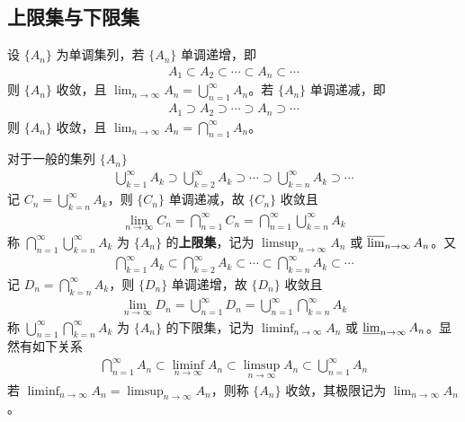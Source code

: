 \documentclass[../../main.tex]{subfiles}
\begin{document}
\subsection{上限集与下限集}

设 $\{A_n\}$ 为单调集列，若 $\{A_n\}$ 单调递增，即
\begin{align*}
A_1 \subset A_2 \subset \cdots \subset A_n \subset \cdots
\end{align*}
则 $\{A_n\}$ 收敛，且 $\lim_{n \to \infty} A_n = \bigcup_{n = 1}^{\infty} A_n$。若 $\{A_n\}$ 单调递减，即
\begin{align*}
A_1 \supset A_2 \supset \cdots \supset A_n \supset \cdots
\end{align*}
则 $\{A_n\}$ 收敛，且 $\lim_{n \to \infty} A_n = \bigcap_{n = 1}^{\infty} A_n$。

\begin{definition}[上限集和下限集]
对于一般的集列 $\{A_n\}$
\begin{align*}
\bigcup_{k = 1}^{\infty} A_k \supset \bigcup_{k = 2}^{\infty} A_k \supset \cdots \supset \bigcup_{k = n}^{\infty} A_k \supset \cdots
\end{align*}
记 $C_n = \bigcup_{k = n}^{\infty} A_k$，则 $\{C_n\}$ 单调递减，故 $\{C_n\}$ 收敛且
\begin{align*}
\lim_{n \to \infty} C_n = \bigcap_{n = 1}^{\infty} C_n = \bigcap_{n = 1}^{\infty} \bigcup_{k = n}^{\infty} A_k
\end{align*}
称 $\bigcap_{n = 1}^{\infty} \bigcup_{k = n}^{\infty} A_k$ 为 $\{A_n\}$ 的\textbf{上限集}，记为 $\limsup_{n \to \infty} A_n$ 或 $\varlimsup_{n \to \infty} A_n$。又
\begin{align*}
\bigcap_{k = 1}^{\infty} A_k \subset \bigcap_{k = 2}^{\infty} A_k \subset \cdots \subset \bigcap_{k = n}^{\infty} A_k \subset \cdots
\end{align*}
记 $D_n = \bigcap_{k = n}^{\infty} A_k$，则 $\{D_n\}$ 单调递增，故 $\{D_n\}$ 收敛且
\begin{align*}
\lim_{n \to \infty} D_n = \bigcup_{n = 1}^{\infty} D_n = \bigcup_{n = 1}^{\infty} \bigcap_{k = n}^{\infty} A_k
\end{align*}
称 $\bigcup_{n = 1}^{\infty} \bigcap_{k = n}^{\infty} A_k$ 为 $\{A_n\}$ 的下限集，记为 $\liminf_{n \to \infty} A_n$ 或 $\varliminf_{n \to \infty} A_n$。显然有如下关系
\begin{align*}
\bigcap_{n = 1}^{\infty} A_n \subset \liminf_{n \to \infty} A_n \subset \limsup_{n \to \infty} A_n \subset \bigcup_{n = 1}^{\infty} A_n
\end{align*}
若 $\liminf_{n \to \infty} A_n = \limsup_{n \to \infty} A_n$，则称 $\{A_n\}$ 收敛，其极限记为 $\lim_{n \to \infty} A_n$。 
\end{definition}
\end{document}
